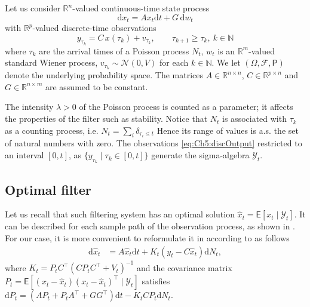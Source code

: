 \documentclass[12pt]{llncs}
\begin{document}
Let us consider $\mathbb{R}^n$-valued continuous-time state process
\begin{equation}\label{eq:Ch5:stateProc}
\mathrm{d} x_t = A x_t \mathrm{d} t + G \, \mathrm{d} w_t
\end{equation}
with $\mathbb{R}^p$-valued discrete-time observations
\begin{equation}\label{eq:Ch5:discOutput}
y_{\tau_{k}} = C \, x(\tau_{k}) + v_{\tau_k}, \qquad \tau_{k+1}\geq \tau_k, \ k\in\mathbb{N}
\end{equation}
where $\tau_k$ are the arrival times of a Poisson process $N_t$,  $w_t$ is an $\mathbb{R}^m$-valued standard Wiener process, $v_{\tau_k} \sim \mathcal{N}(0,V)$ for each $k \in \mathbb{N}$. We let $(\Omega,\mathcal{F}, \mathsf{P})$ denote the underlying probability space.  The matrices $A \in \mathbb{R}^{n\times n}$, $C \in \mathbb{R}^{p\times n}$ and $G \in \mathbb{R}^{n \times m}$ are assumed to be constant.

The intensity $\lambda>0$ of the Poisson process is counted as a parameter; it affects the properties of the filter such as stability. Notice that $N_t$ is associated with $\tau_k$ as a counting process, i.e.
$
    N_t = \sum_i \delta_{\tau_i\leq t}
$
Hence its range of values is a.s. the set of natural numbers with zero.
The observations \eqref{eq:Ch5:discOutput} restricted to an interval $[0,t]$, as $\{y_{\tau_k} \mid \tau_k\in[0,t]\}$  generate the sigma-algebra $\mathcal{Y}_t$.


\subsection{Optimal filter}


Let us recall that such filtering system has an optimal solution $\widehat x_t = \mathsf{E}[x_t \mid \mathcal{Y}_t]$. It can be described for each sample path of the observation process, as shown in \cite[Th. 7.1]{jazw}. For our case, it is more convenient to reformulate it in according to \cite[Th. 3.3]{yufer-transport} as follows
\begin{align}
\label{eq:ch5: opt-x}
\mathrm{d} \widehat x_t  &= A \widehat x_t \mathrm{d} t + K_t(y_t - C \widehat x_{t})\mathrm{d} N_t,
\end{align}
where $K_t = P_t C^\top (C P_t C^\top + V_t)^{-1}$ and the covariance matrix $P_t= \mathsf{E}[(x_t - \widehat x_t)(x_t - \widehat x_t)^\top \mid \mathcal{Y}_t]$ satisfies
$\mathrm{d} P_t = (A P_t + P_t A^\top + G G^\top) \mathrm{d} t  - K_t C P_t \mathrm{d} N_t. $%
\end{document}

